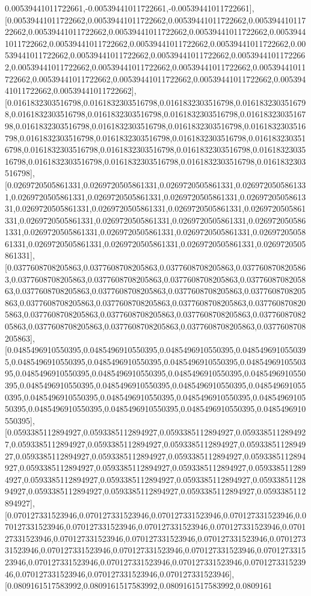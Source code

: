 \documentclass{article}
\begin{document}
0.00539441011722661,-0.00539441011722661,-0.00539441011722661],[0.00539441011722662,0.00539441011722662,0.00539441011722662,0.00539441011722662,0.00539441011722662,0.00539441011722662,0.00539441011722662,0.00539441011722662,0.00539441011722662,0.00539441011722662,0.00539441011722662,0.00539441011722662,0.00539441011722662,0.00539441011722662,0.00539441011722662,0.00539441011722662,0.00539441011722662,0.00539441011722662,0.00539441011722662,0.00539441011722662,0.00539441011722662,0.00539441011722662,0.00539441011722662,0.00539441011722662],[0.0161832303516798,0.0161832303516798,0.0161832303516798,0.0161832303516798,0.0161832303516798,0.0161832303516798,0.0161832303516798,0.0161832303516798,0.0161832303516798,0.0161832303516798,0.0161832303516798,0.0161832303516798,0.0161832303516798,0.0161832303516798,0.0161832303516798,0.0161832303516798,0.0161832303516798,0.0161832303516798,0.0161832303516798,0.0161832303516798,0.0161832303516798,0.0161832303516798,0.0161832303516798,0.0161832303516798],[0.0269720505861331,0.0269720505861331,0.0269720505861331,0.0269720505861331,0.0269720505861331,0.0269720505861331,0.0269720505861331,0.0269720505861331,0.0269720505861331,0.0269720505861331,0.0269720505861331,0.0269720505861331,0.0269720505861331,0.0269720505861331,0.0269720505861331,0.0269720505861331,0.0269720505861331,0.0269720505861331,0.0269720505861331,0.0269720505861331,0.0269720505861331,0.0269720505861331,0.0269720505861331,0.0269720505861331],[0.0377608708205863,0.0377608708205863,0.0377608708205863,0.0377608708205863,0.0377608708205863,0.0377608708205863,0.0377608708205863,0.0377608708205863,0.0377608708205863,0.0377608708205863,0.0377608708205863,0.0377608708205863,0.0377608708205863,0.0377608708205863,0.0377608708205863,0.0377608708205863,0.0377608708205863,0.0377608708205863,0.0377608708205863,0.0377608708205863,0.0377608708205863,0.0377608708205863,0.0377608708205863,0.0377608708205863],[0.0485496910550395,0.0485496910550395,0.0485496910550395,0.0485496910550395,0.0485496910550395,0.0485496910550395,0.0485496910550395,0.0485496910550395,0.0485496910550395,0.0485496910550395,0.0485496910550395,0.0485496910550395,0.0485496910550395,0.0485496910550395,0.0485496910550395,0.0485496910550395,0.0485496910550395,0.0485496910550395,0.0485496910550395,0.0485496910550395,0.0485496910550395,0.0485496910550395,0.0485496910550395,0.0485496910550395],[0.0593385112894927,0.0593385112894927,0.0593385112894927,0.0593385112894927,0.0593385112894927,0.0593385112894927,0.0593385112894927,0.0593385112894927,0.0593385112894927,0.0593385112894927,0.0593385112894927,0.0593385112894927,0.0593385112894927,0.0593385112894927,0.0593385112894927,0.0593385112894927,0.0593385112894927,0.0593385112894927,0.0593385112894927,0.0593385112894927,0.0593385112894927,0.0593385112894927,0.0593385112894927,0.0593385112894927],[0.070127331523946,0.070127331523946,0.070127331523946,0.070127331523946,0.070127331523946,0.070127331523946,0.070127331523946,0.070127331523946,0.070127331523946,0.070127331523946,0.070127331523946,0.070127331523946,0.070127331523946,0.070127331523946,0.070127331523946,0.070127331523946,0.070127331523946,0.070127331523946,0.070127331523946,0.070127331523946,0.070127331523946,0.070127331523946,0.070127331523946,0.070127331523946],[0.0809161517583992,0.0809161517583992,0.0809161517583992,0.0809161
\end{document}
